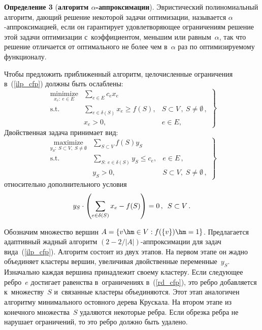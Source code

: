 \begin{multicols}{2}
\smallskip

\noindent
\textbf{Определение 3} (\textbf{алгоритм $\alpha$-аппроксимации}).
Эвристический полиномиальный алгоритм, дающий решение некоторой задачи 
оптимизации, называется $\alpha$-ап\-прок\-си\-ма\-ци\-ей, если он гарантирует 
удовлетворяющее ограничениям решение этой задачи оптимизации с~коэффициентом, 
меньшим или равным~$\alpha$, так что решение отличается от оптимального не более 
чем в~$\alpha$ раз по оптимизируемому функционалу.


\smallskip

Чтобы предложить приближенный алгоритм, целочисленные ограничения 
в~(\ref{ilp_cfp}) должны быть ослаблены:
\begin{equation}
\left.
\begin{array}{rll}
\underset{x_e:~e\in E}{\mbox{minimize}} & \displaystyle \sum\limits_{e\in E}c_ex_e \\[6pt]
\mbox{s.t.} & \displaystyle \sum\limits_{e\in \delta(S)}x_e\geqslant f(S), & S \subset V\,, \ S \not= \emptyset\,,\\[6pt]
& x_e>0, & e\in E,
\end{array}
\right\}
\label{rlp_cfp}
\end{equation}
Двойственная задача принимает вид:
\begin{equation}
\left.
\begin{array}{rll}
\underset{y_S:~S \subset V, \; S \not= \emptyset}{\mbox{maximize}} & 
\displaystyle \sum\limits_{S\subset V}f(S)y_S \\[6pt]
\mbox{s.t.} & \displaystyle \sum\limits_{S:~e\in \delta(S)}y_S\leqslant c_e, & e\in E\,,\\[6pt]
& y_S>0, &S \subset V, \; S \not= \emptyset\,,
\end{array}
\right\}
\label{rd_cfp}
\end{equation}
относительно дополнительного условия
$$
y_S\cdot \left(\sum\limits_{e\in \delta(S)}x_e - f(S)\right) = 0\,,\enskip S\subset  V\,.
$$

Обозначим множество вершин $A=\{v\hm\in V: f(\{v\})\hm=1\}$. Предлагается адаптивный 
жадный алгоритм $\left(2-{2}/{\vert A\vert }\right)$-ап\-прок\-си\-ма\-ции для задач 
вида~(\ref{ilp_cfp}). Алгоритм состоит из двух этапов. На первом этапе он жадно 
объединяет кластеры вершин, увеличивая двойственные переменные~$y_S$. Изначально 
каждая вершина принадлежит своему кластеру. Если следующее ребро~$e$ достигает 
равенства в~ограничениях в~(\ref{rd_cfp}), это ребро добавляется к~множеству~$S$ и~связанные кластеры объединяются. Этот этап аналогичен алгоритму минимального 
остовного дерева Крускала. На втором этапе из конечного множества~$S$ удаляются 
некоторые ребра. Если обрезка ребра не нарушает ограничений, то это реб\-ро должно 
быть удалено.



\end{multicols}
